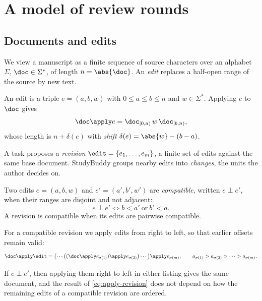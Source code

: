\section{A model of review rounds}
\label{sec:model}

\subsection{Documents and edits}

We view a manuscript as a finite sequence of source characters over an
alphabet $\Sigma$, $\doc \in \Sigma^{*}$, of length $n = \abs{\doc}$. An
\emph{edit} replaces a half-open range of the source by new text.

\begin{definition}[Edit]
An edit is a triple $e = (a, b, w)$ with $0 \le a \le b \le n$ and
$w \in \Sigma^{*}$. Applying $e$ to $\doc$ gives
\begin{equation}
  \doc \apply e = \doc_{[0,a)} \, w \, \doc_{[b,n)},
  \label{eq:apply}
\end{equation}
whose length is $n + \delta(e)$ with \emph{shift} $\delta(e) = \abs{w} - (b - a)$.
\end{definition}

A task proposes a \emph{revision} $\edit = \{e_1, \dots, e_m\}$, a finite set
of edits against the same base document. StudyBuddy groups nearby edits into
\emph{changes}, the units the author decides on.

\begin{definition}[Compatibility]
Two edits $e = (a, b, w)$ and $e' = (a', b', w')$ are \emph{compatible},
written $e \perp e'$, when their ranges are disjoint and not adjacent:
\begin{equation}
  e \perp e' \iff b < a' \ \text{or}\ b' < a .
  \label{eq:compatible}
\end{equation}
A revision is compatible when its edits are pairwise compatible.
\end{definition}

For a compatible revision we apply edits from right to left, so that earlier
offsets remain valid:
\begin{equation}
  \doc \apply \edit
  = \bigl(\cdots\bigl((\doc \apply e_{\sigma(1)}) \apply e_{\sigma(2)}\bigr)
    \cdots\bigr) \apply e_{\sigma(m)},
  \qquad a_{\sigma(1)} > a_{\sigma(2)} > \dots > a_{\sigma(m)} .
  \label{eq:apply-revision}
\end{equation}

\begin{proposition}
\label{prop:commute}
If $e \perp e'$, then applying them right to left in either listing gives the
same document, and the result of \cref{eq:apply-revision} does not depend on
how the remaining edits of a compatible revision are ordered.
\end{proposition}

